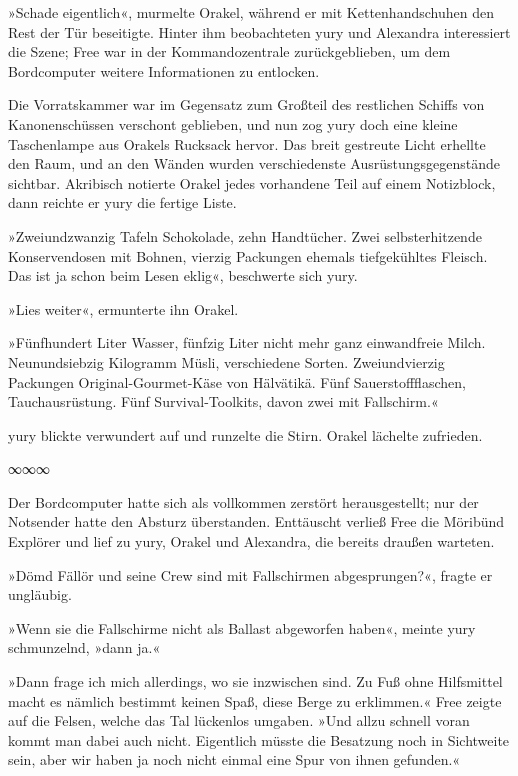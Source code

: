 »Schade eigentlich«, murmelte Orakel, während er mit Kettenhandschuhen den Rest der Tür beseitigte. Hinter ihm beobachteten yury und Alexandra interessiert die Szene; Free war in der Kommandozentrale zurückgeblieben, um dem Bordcomputer weitere Informationen zu entlocken.

Die Vorratskammer war im Gegensatz zum Großteil des restlichen Schiffs von Kanonenschüssen verschont geblieben, und nun zog yury doch eine kleine Taschenlampe aus Orakels Rucksack hervor. Das breit gestreute Licht erhellte den Raum, und an den Wänden wurden verschiedenste Ausrüstungsgegenstände sichtbar. Akribisch notierte Orakel jedes vorhandene Teil auf einem Notizblock, dann reichte er yury die fertige Liste.

»Zweiundzwanzig Tafeln Schokolade, zehn Handtücher. Zwei selbsterhitzende Konservendosen mit Bohnen, vierzig Packungen ehemals tiefgekühltes Fleisch. Das ist ja schon beim Lesen eklig«, beschwerte sich yury.

»Lies weiter«, ermunterte ihn Orakel.

»Fünfhundert Liter Wasser, fünfzig Liter nicht mehr ganz einwandfreie Milch. Neunundsiebzig Kilogramm Müsli, verschiedene Sorten. Zweiundvierzig Packungen Original-Gourmet-Käse von Hälvätikä. Fünf Sauerstoffflaschen, Tauchausrüstung. Fünf Survival-Toolkits, davon zwei mit Fallschirm.«

yury blickte verwundert auf und runzelte die Stirn. Orakel lächelte zufrieden.

\begin{center}
    ∞∞∞
\end{center}

Der Bordcomputer hatte sich als vollkommen zerstört herausgestellt; nur der Notsender hatte den Absturz überstanden. Enttäuscht verließ Free die Möribünd Explörer und lief zu yury, Orakel und Alexandra, die bereits draußen warteten.

»Dömd Fällör und seine Crew sind mit Fallschirmen abgesprungen?«, fragte er ungläubig.

»Wenn sie die Fallschirme nicht als Ballast abgeworfen haben«, meinte yury schmunzelnd, »dann ja.«

»Dann frage ich mich allerdings, wo sie inzwischen sind. Zu Fuß ohne Hilfsmittel macht es nämlich bestimmt keinen Spaß, diese Berge zu erklimmen.« Free zeigte auf die Felsen, welche das Tal lückenlos umgaben. »Und allzu schnell voran kommt man dabei auch nicht. Eigentlich müsste die Besatzung noch in Sichtweite sein, aber wir haben ja noch nicht einmal eine Spur von ihnen gefunden.«

